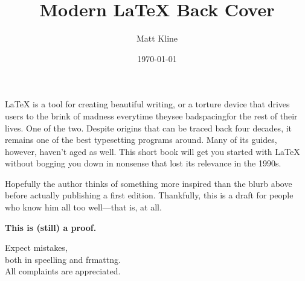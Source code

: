 \documentclass[fontsize=11bp]{scrartcl}
\title{Modern LaTeX Back Cover}
\author{Matt Kline}
\date{\today}
\begin{document}
\fontsize{11bp}{14bp}\selectfont
\pagestyle{empty}
\setlength\parindent{0pt}

\LaTeX{} is a tool for creating beautiful writing,
or a torture device that drives users to the brink of madness
every\enspace time
they\enspace see\quad
bad\quad spacing\quad for the rest of their\,lives.
One of the two.
Despite origins that can be traced back four decades,
it remains one of the best typesetting programs around.
Many of its guides, however, haven't aged as well.
This short book will get you started with \LaTeX{}
without bogging you down in nonsense that lost its relevance
in the 1990s.
\vspace{0.5in}

Hopefully the author thinks of something more inspired than the blurb above before
actually publishing a first edition.
Thankfully, this is a draft for people who know him all too well---that is,
at all.

\vspace{2in}
\sffamily%
\Large%
\begin{center}
\color{red}
\textbf{This is (still) a proof.}
\bigskip

Expect mistakes,\\
both in speelling and f\raisebox{-0.2ex}{o}rmatt\raisebox{0.1ex}{i}ng.\\
All complaints are appreciated.
\end{center}
\end{document}
